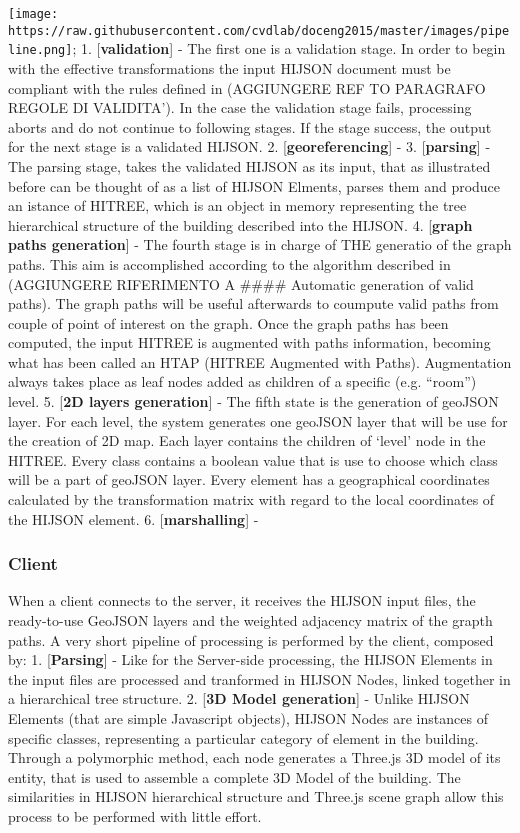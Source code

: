 \documentclass[]{article}
\begin{document}
\texttt{[image: https://raw.githubusercontent.com/cvdlab/doceng2015/master/images/pipeline.png]};
1. {[}\textbf{validation}{]} - The first one is a validation stage. In
order to begin with the effective transformations the input HIJSON
document must be compliant with the rules defined in (AGGIUNGERE REF TO
PARAGRAFO REGOLE DI VALIDITA'). In the case the validation stage fails,
processing aborts and do not continue to following stages. If the stage
success, the output for the next stage is a validated HIJSON. 2.
{[}\textbf{georeferencing}{]} - 3. {[}\textbf{parsing}{]} - The parsing
stage, takes the validated HIJSON as its input, that as illustrated
before can be thought of as a list of HIJSON Elments, parses them and
produce an istance of HITREE, which is an object in memory representing
the tree hierarchical structure of the building described into the
HIJSON. 4. {[}\textbf{graph paths generation}{]} - The fourth stage is
in charge of THE generatio of the graph paths. This aim is accomplished
according to the algorithm described in (AGGIUNGERE RIFERIMENTO A
\#\#\#\# Automatic generation of valid paths). The graph paths will be
useful afterwards to coumpute valid paths from couple of point of
interest on the graph. Once the graph paths has been computed, the input
HITREE is augmented with paths information, becoming what has been
called an HTAP (HITREE Augmented with Paths). Augmentation always takes
place as leaf nodes added as children of a specific (e.g. ``room'')
level. 5. {[}\textbf{2D layers generation}{]} - The fifth state is the
generation of geoJSON layer. For each level, the system generates one
geoJSON layer that will be use for the creation of 2D map. Each layer
contains the children of `level' node in the HITREE. Every class
contains a boolean value that is use to choose which class will be a
part of geoJSON layer. Every element has a geographical coordinates
calculated by the transformation matrix with regard to the local
coordinates of the HIJSON element. 6. {[}\textbf{marshalling}{]} -

\subsubsection{Client}\label{client}

When a client connects to the server, it receives the HIJSON input
files, the ready-to-use GeoJSON layers and the weighted adjacency matrix
of the grapth paths. A very short pipeline of processing is performed by
the client, composed by: 1. {[}\textbf{Parsing}{]} - Like for the
Server-side processing, the HIJSON Elements in the input files are
processed and tranformed in HIJSON Nodes, linked together in a
hierarchical tree structure. 2. {[}\textbf{3D Model generation}{]} -
Unlike HIJSON Elements (that are simple Javascript objects), HIJSON
Nodes are instances of specific classes, representing a particular
category of element in the building. Through a polymorphic method, each
node generates a Three.js 3D model of its entity, that is used to
assemble a complete 3D Model of the building. The similarities in HIJSON
hierarchical structure and Three.js scene graph allow this process to be
performed with little effort.
\end{document}
